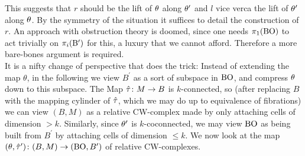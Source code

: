 This suggests that $r$ should be the lift of $\theta$ along $\theta^\prime$ and $l$ vice verca the lift of $\theta^\prime$ along $\theta$.
By the symmetry of the situation it suffices to detail the construction of $r$. 
An approach with obstruction theory is doomed, since one needs $\pi_1(\mathrm{BO})$ to act trivially on $\pi_i(\mathrm{B}^\prime)$ for this, a luxury that we cannot afford.
Therefore a more bare-bones argument is required.\\
It is a nifty change of perspective that does the trick:
Instead of extending the map $\theta$, in the following we view $B^\prime$ as a sort of subspace in $\mathrm{BO}$, and compress $\theta$ down to this subspace.
The Map $\hat{\tau}\colon M\to B$ is $k$-connected, so (after replacing $B$ with the mapping cylinder of $\hat{\tau}$, which we may do up to equivalence of fibrations) we can view $(B,M)$ as a relative CW-complex made by only attaching cells of dimension $> k$. 
Similarly, since $\theta^\prime$ is $k$-coconnected, we may view $\mathrm{BO}$ as being built from $B^\prime$ by attaching cells of dimension $\leq k$.
We now look at the map $(\theta,\hat{\tau}^\prime)\colon (B,M) \to (\mathrm{BO},B^\prime)$ of relative CW-complexes. 
\begin{center}
\end{center}
